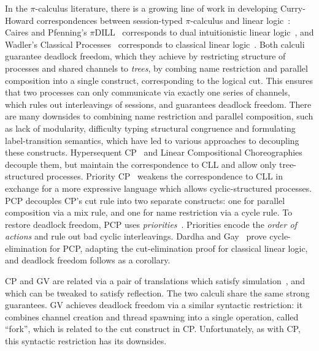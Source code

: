 \documentclass[main.tex]{subfiles}
\begin{document}
In the $\pi$-calculus literature, there is a growing line of work in developing Curry-Howard correspondences between session-typed $\pi$-calculus and linear logic~\cite{girard87}: Caires and Pfenning's $\pi$DILL~\cite{cairespfenning10} corresponds to dual intuitionistic linear logic~\cite{barber96}, and Wadler's Classical Processes~\cite[CP]{wadler14} corresponds to classical linear logic~\cite[CLL]{girard87}. Both calculi guarantee deadlock freedom, which they achieve by restricting structure of processes and shared channels to \emph{trees}, by combing name restriction and parallel composition into a single construct, corresponding to the logical cut. This ensures that two processes can only communicate via exactly one series of channels, which rules out interleavings of sessions, and guarantees deadlock freedom.
There are many downsides to combining name restriction and parallel composition, such as lack of modularity, difficulty typing structural congruence and formulating label-transition semantics, which have led to various approaches to decoupling these constructs. Hypersequent CP~\cite{MP18,kokkemontesi19popl,kokkemontesi19tlla} and Linear Compositional Choreographies~\cite{CarboneMS18} decouple them, but maintain the correspondence to CLL and allow only tree-structured processes. Priority CP~\cite[PCP]{dardhagay18extended} weakens the correspondence to CLL in exchange for a more expressive language which allows cyclic-structured processes. PCP decouples CP's cut rule into two separate constructs: one for parallel composition via a mix rule, and one for name restriction via a cycle rule. To restore deadlock freedom, PCP uses \emph{priorities}~\cite{kobayashi06,padovani14}. Priorities encode the \emph{order of actions} and rule out bad cyclic interleavings. Dardha and Gay~\cite{dardhagay18extended} prove cycle-elimination for PCP, adapting the cut-elimination proof for classical linear logic, and deadlock freedom follows as a corollary.

CP and GV are related via a pair of translations which satisfy simulation~\cite{lindleymorris16}, and which can be tweaked to satisfy reflection. The two calculi share the same strong guarantees. GV achieves deadlock freedom via a similar syntactic restriction: it combines channel creation and thread spawning into a single operation, called ``fork'', which is related to the cut construct in CP. Unfortunately, as with CP, this syntactic restriction has its downsides.
\end{document}

